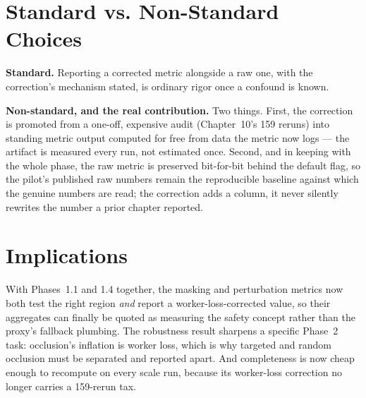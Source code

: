 \section{Standard vs. Non-Standard Choices}

\textbf{Standard.} Reporting a corrected metric alongside a raw one, with the correction's mechanism
stated, is ordinary rigor once a confound is known.

\textbf{Non-standard, and the real contribution.} Two things. First, the correction is promoted from a
one-off, expensive audit (Chapter~10's 159 reruns) into standing metric output computed for free from
data the metric now logs --- the artifact is measured every run, not estimated once. Second, and in
keeping with the whole phase, the raw metric is preserved bit-for-bit behind the default flag, so the
pilot's published raw numbers remain the reproducible baseline against which the genuine numbers are
read; the correction adds a column, it never silently rewrites the number a prior chapter reported.

\section{Implications}

With Phases~1.1 and 1.4 together, the masking and perturbation metrics now both test the right region
\emph{and} report a worker-loss-corrected value, so their aggregates can finally be quoted as measuring
the safety concept rather than the proxy's fallback plumbing. The robustness result sharpens a specific
Phase~2 task: occlusion's inflation is worker loss, which is why targeted and random occlusion must be
separated and reported apart. And completeness is now cheap enough to recompute on every scale run,
because its worker-loss correction no longer carries a 159-rerun tax.
